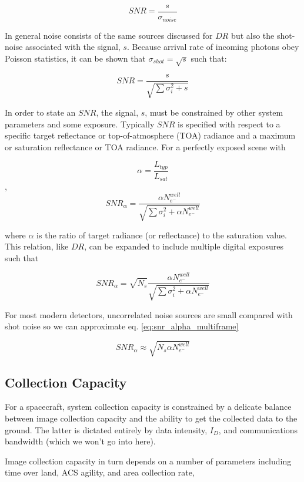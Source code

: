 \documentclass[10pt,journal]{IEEEtran}  %
\begin{document}
$$SNR = \frac{s}{\sigma_{noise}}$$

In general noise consists of the same sources discussed for $DR$ but also the shot-noise associated with the signal, $s$.  Because arrival rate of incoming photons obey Poisson statistics, it can be shown that $\sigma_{shot} = \sqrt{s}$ such that:

$$SNR = \frac{s}{\sqrt{\sum{\sigma_i^2} + s}}$$

In order to state an $SNR$, the signal, $s$, must be constrained by other system parameters and some exposure.  Typically $SNR$ is specified with respect to a specific target reflectance or top-of-atmosphere (TOA) radiance and a maximum or saturation reflectance or TOA radiance.  For a perfectly exposed scene with

$$\alpha = \frac{L_{typ}}{L_{sat}}$$
,
$$SNR_{\alpha} = \frac{\alpha N_{e^-}^{well}}{\sqrt{\sum{\sigma_i^2} + \alpha N_{e^-}^{well}}}$$

where $\alpha$ is the ratio of target radiance (or reflectance) to the saturation value.  This relation, like $DR$, can be expanded to include multiple digital exposures such that

\begin{equation}
\label{eq:snr_alpha_multiframe}
SNR_{\alpha} = \sqrt{N_s}\frac{\alpha N_{e^-}^{well}}{\sqrt{\sum{\sigma_i^2} + \alpha N_{e^-}^{well}}}
\end{equation}

For most modern detectors, uncorrelated noise sources are small compared with shot noise so we can approximate eq. \ref{eq:snr_alpha_multiframe}

\begin{equation}
\label{eq:snr_alpha_multiframe_simp}
SNR_{\alpha} \approx \sqrt{N_s \alpha N_{e^-}^{well}}
\end{equation}

\subsection{Collection Capacity}
\label{sec:capacity}
For a spacecraft, system collection capacity is constrained by a delicate balance between image collection capacity and the ability to get the collected data to the ground.  The latter is dictated entirely by data intensity, $I_D$, and communications bandwidth (which we won't go into here).  

Image collection capacity in turn depends on a number of parameters including time over land, ACS agility, and area collection rate,
\end{document}
